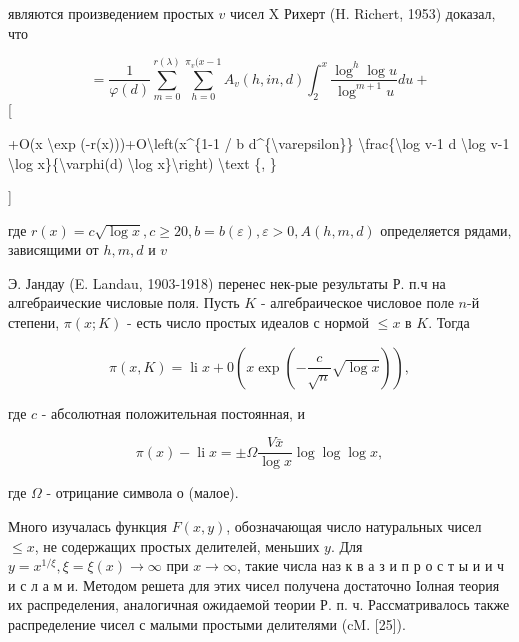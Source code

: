 \documentclass[10pt]{article}
\begin{document}
являются произведением простых $v$ чисел $\mathrm{X}$ Рихерт (H. Richert, 1953) доказал, что



\[

=\frac{1}{\varphi(d)} \sum_{m=0}^{r(\lambda)} \sum_{h=0}^{\pi_{v}(x-1} A_{v}(h, i n, d) \int_{2}^{x} \frac{\log ^{h} \log u}{\log ^{m+1} u} d u+

\][



+O(x \textbackslash exp (-r(x)))+O\textbackslash left(x\^{}\{1-1 / b d\^{}\{\textbackslash varepsilon\}\} \textbackslash frac\{\textbackslash log v-1 d \textbackslash log v-1 \textbackslash log x\}\{\textbackslash varphi(d) \textbackslash log x\}\textbackslash right) \textbackslash text \{, \}

]



где $r(x)=c \sqrt{\log x}, c \geqslant 20, b=b(\varepsilon), \varepsilon>0, A(h, m, d)$ определяется рядами, зависящими от $h, m, d$ и $v$



Э. Јандау (E. Landau, 1903-1918) перенес нек-рые результаты Р. п.ч на алгебраические числовые поля. Пусть $K$ - алгебраическое числовое поле $n$-й степени, $\pi(x ; K)$ - есть число простых идеалов с нормой $\leqslant x$ в $K$. Тогда



\[

\pi(x, K)=\operatorname{li} x+0\left(x \exp \left(-\frac{c}{\sqrt{n}} \sqrt{\log x}\right)\right),

\]



где $c$ - абсолютная положительная постоянная, и



\[

\pi(x)-\operatorname{li} x= \pm \Omega \frac{V \bar{x}}{\log x} \log \log \log x,

\]



где $\Omega$ - отрицание символа $о$ (малое).



Много изучалась функция $F(x, y)$, обозначающая число натуральных чисел $\leqslant x$, не содержащих простых делителей, меньших $y$. Для $y=x^{1 / \xi}, \xi=\xi(x) \rightarrow \infty$ при $x \rightarrow \infty$, такие числа наз к в а з и п р о с т ы и и ч и с л а м и. Методом решета для этих чисел получена достаточно Іолная теория их распределения, аналогичная ожидаемой теории Р. п. ч. Рассматривалось также распределение чисел с малыми простыми делителями (cM. [25]).
\end{document}
